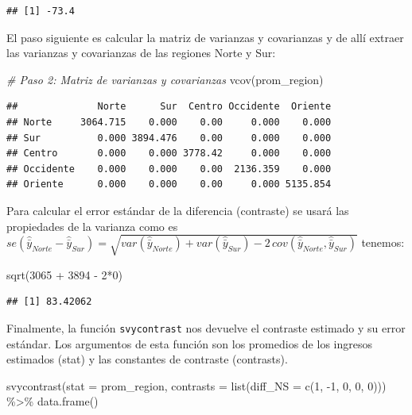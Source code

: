 \documentclass[
  12pt,
]{book}
\newenvironment{Shaded}{\begin{snugshade}}{\end{snugshade}}
\newcommand{\AttributeTok}[1]{\textcolor[rgb]{0.77,0.63,0.00}{#1}}
\newcommand{\CommentTok}[1]{\textcolor[rgb]{0.56,0.35,0.01}{\textit{#1}}}
\newcommand{\DecValTok}[1]{\textcolor[rgb]{0.00,0.00,0.81}{#1}}
\newcommand{\FunctionTok}[1]{\textcolor[rgb]{0.00,0.00,0.00}{#1}}
\newcommand{\NormalTok}[1]{#1}
\newcommand{\SpecialCharTok}[1]{\textcolor[rgb]{0.00,0.00,0.00}{#1}}
\begin{document}
\begin{verbatim}
## [1] -73.4
\end{verbatim}

El paso siguiente es calcular la matriz de varianzas y covarianzas y de allí extraer las varianzas y covarianzas de las regiones Norte y Sur:

\begin{Shaded}
\begin{Highlighting}[]
\CommentTok{\# Paso 2: Matriz de varianzas y covarianzas}
\FunctionTok{vcov}\NormalTok{(prom\_region)}
\end{Highlighting}
\end{Shaded}

\begin{verbatim}
##              Norte      Sur  Centro Occidente  Oriente
## Norte     3064.715    0.000    0.00     0.000    0.000
## Sur          0.000 3894.476    0.00     0.000    0.000
## Centro       0.000    0.000 3778.42     0.000    0.000
## Occidente    0.000    0.000    0.00  2136.359    0.000
## Oriente      0.000    0.000    0.00     0.000 5135.854
\end{verbatim}

Para calcular el error estándar de la diferencia (contraste) se usará las propiedades de la varianza como es
\(se\left(\hat{\bar{y}}_{Norte}-\hat{\bar{y}}_{Sur}\right)=\sqrt{var\left(\hat{\bar{y}}_{Norte}\right)+var\left(\hat{\bar{y}}_{Sur}\right)-2\,cov\left(\hat{\bar{y}}_{Norte},\hat{\bar{y}}_{Sur}\right)}\) tenemos:

\begin{Shaded}
\begin{Highlighting}[]
\FunctionTok{sqrt}\NormalTok{(}\DecValTok{3065} \SpecialCharTok{+} \DecValTok{3894} \SpecialCharTok{{-}} \DecValTok{2}\SpecialCharTok{*}\DecValTok{0}\NormalTok{)}
\end{Highlighting}
\end{Shaded}

\begin{verbatim}
## [1] 83.42062
\end{verbatim}

Finalmente, la función \texttt{svycontrast} nos devuelve el contraste estimado y su error estándar. Los argumentos de esta función son los promedios de los ingresos estimados (stat) y las constantes de contraste (contrasts).

\begin{Shaded}
\begin{Highlighting}[]
\FunctionTok{svycontrast}\NormalTok{(}\AttributeTok{stat =}\NormalTok{ prom\_region, }
            \AttributeTok{contrasts =} \FunctionTok{list}\NormalTok{(}\AttributeTok{diff\_NS =} \FunctionTok{c}\NormalTok{(}\DecValTok{1}\NormalTok{, }\SpecialCharTok{{-}}\DecValTok{1}\NormalTok{, }\DecValTok{0}\NormalTok{, }\DecValTok{0}\NormalTok{, }\DecValTok{0}\NormalTok{))) }\SpecialCharTok{\%\textgreater{}\%}
            \FunctionTok{data.frame}\NormalTok{()}
\end{Highlighting}
\end{Shaded}
\end{document}
